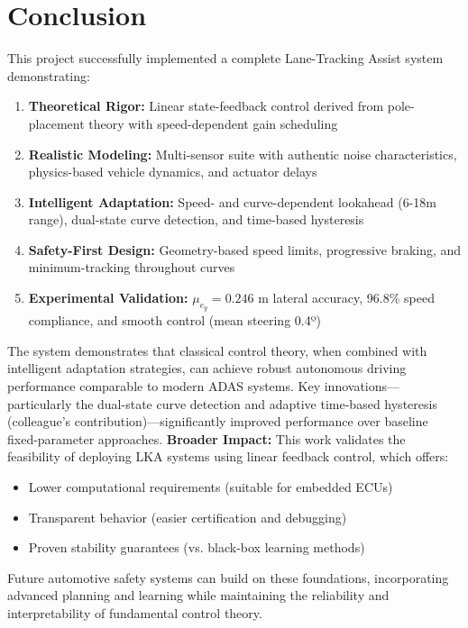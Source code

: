 \documentclass[12pt]{article}
\begin{document}
\section{Conclusion}
This project successfully implemented a complete Lane-Tracking Assist system demonstrating:
\begin{enumerate}
\item \textbf{Theoretical Rigor:} Linear state-feedback control derived from pole-placement theory with speed-dependent gain scheduling
\item \textbf{Realistic Modeling:} Multi-sensor suite with authentic noise characteristics, physics-based vehicle dynamics, and actuator delays

\item \textbf{Intelligent Adaptation:} Speed- and curve-dependent lookahead (6-18m range), dual-state curve detection, and time-based hysteresis

\item \textbf{Safety-First Design:} Geometry-based speed limits, progressive braking, and minimum-tracking throughout curves

\item \textbf{Experimental Validation:} $\mu_{e_y} = 0.246$ m lateral accuracy, 96.8\% speed compliance, and smooth control (mean steering 0.4º)
\end{enumerate}
The system demonstrates that classical control theory, when combined with intelligent adaptation strategies, can achieve robust autonomous driving performance comparable to modern ADAS systems. Key innovations—particularly the dual-state curve detection and adaptive time-based hysteresis (colleague's contribution)—significantly improved performance over baseline fixed-parameter approaches.
\textbf{Broader Impact:} This work validates the feasibility of deploying LKA systems using linear feedback control, which offers:
\begin{itemize}
\item Lower computational requirements (suitable for embedded ECUs)
\item Transparent behavior (easier certification and debugging)
\item Proven stability guarantees (vs. black-box learning methods)
\end{itemize}
Future automotive safety systems can build on these foundations, incorporating advanced planning and learning while maintaining the reliability and interpretability of fundamental control theory.
\end{document}
